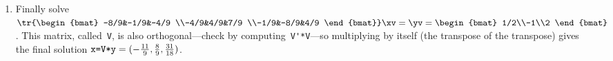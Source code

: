 \begin{example}
\begin{solution}
\begin{enumerate}
\item Finally solve \(\tr{\begin{bmat} -8/9&-1/9&-4/9
\\-4/9&4/9&7/9
\\-1/9&-8/9&4/9 \end{bmat}}\xv=\yv=\begin{bmat} 1/2\\-1\\2 \end{bmat}\). 
This matrix, called~\verb|V|, is also orthogonal---check by computing~\verb|V'*V|---so multiplying by itself (the transpose of the transpose) gives the final solution
\(\verb|x=V*y|=(-\frac{11}9,\frac89,\frac{31}{18})\).

\end{enumerate}
\end{solution}
\end{example}





